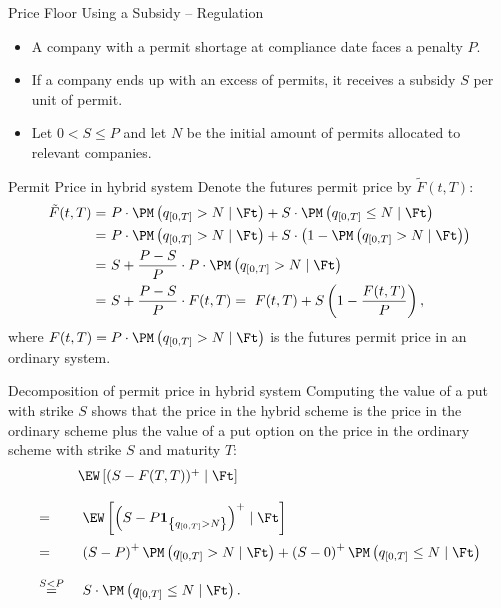 {Price Floor Using a Subsidy -- Regulation}
\begin{itemize}
\item<1-> A company with a permit shortage at compliance date faces a penalty $P$.
\item<2-> If a company ends up with an excess of permits, it receives a subsidy $S$ per unit of permit.
\item<3-> Let $0<S\leq P$ and let $N$ be the initial amount of permits allocated to relevant companies.
\end{itemize}


{Permit Price in hybrid system}
Denote the futures permit price by $\tilde{F}(t,T)$:
\begin{align*}
\tilde{F}(t,T) =& \ P \cdot \PM \left( q_{[0,T]} > N \mid \Ft \right) + S \cdot \PM \left( q_{[0,T]} \le N \mid \Ft \right) \\
  =& \ P \cdot \PM \left( q_{[0,T]} > N \mid \Ft \right) + S \cdot \left( 1 - \PM \left( q_{[0,T]} > N \mid \Ft \right)\right) \\
  =& \ S + \frac{P-S}{P} \cdot P \cdot \PM \left( q_{[0,T]} > N \mid \Ft \right) \\
  =& \ S + \frac{P-S}{P} \cdot F(t,T) = \ F(t,T) + S\left(1 - \frac{F(t,T)}{P}\right),
\end{align*}
where $F(t,T) = P \cdot \PM \left( q_{[0,T]} > N \mid \Ft \right)$ is the futures permit price in an ordinary system.



{Decomposition of permit price in hybrid system}
Computing the value of a put with strike $S$ shows that the price in the hybrid scheme is the price in the ordinary scheme plus the value of a put option on the price in the ordinary scheme with strike $S$ and maturity $T$:
$$
\begin{array}{ll}
&\EW\left[ (S-F(T,T))^+ \mid \Ft \right]\\*[12pt]
=& \ \EW\left[ \left( S- P \textbf{1}_{\left\{ q_{[0,T]} > N \right\}} \right)^+ \mid \Ft \right] \\*[12pt]
=& \ \left( S- P \right)^+ \PM \left( q_{[0,T]} > N \mid \Ft \right) + \left( S- 0 \right)^+ \PM \left( q_{[0,T]} \le N \mid \Ft \right) \\*[12pt]
 \stackrel{S<P}{=}& \ S \cdot \PM \left( q_{[0,T]} \le N \mid \Ft \right).
\end{array}
$$



